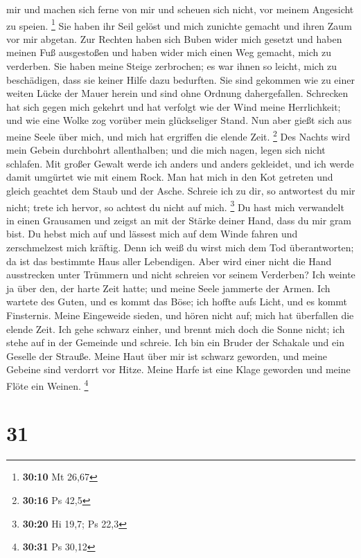 mir und machen sich ferne von mir und scheuen sich nicht, vor meinem
Angesicht zu speien. \footnote{\textbf{30:10} Mt 26,67} 
Sie haben ihr Seil gelöst und mich zunichte gemacht und ihren Zaum vor
mir abgetan.  Zur Rechten haben sich Buben wider mich
gesetzt und haben meinen Fuß ausgestoßen und haben wider mich einen Weg
gemacht, mich zu verderben.  Sie haben meine Steige
zerbrochen; es war ihnen so leicht, mich zu beschädigen, dass sie keiner
Hilfe dazu bedurften.  Sie sind gekommen wie zu einer
weiten Lücke der Mauer herein und sind ohne Ordnung dahergefallen.
 Schrecken hat sich gegen mich gekehrt und hat verfolgt wie
der Wind meine Herrlichkeit; und wie eine Wolke zog vorüber mein
glückseliger Stand.  Nun aber gießt sich aus meine Seele
über mich, und mich hat ergriffen die elende Zeit. \footnote{\textbf{30:16}
  Ps 42,5}  Des Nachts wird mein Gebein durchbohrt
allenthalben; und die mich nagen, legen sich nicht schlafen.
 Mit großer Gewalt werde ich anders und anders gekleidet,
und ich werde damit umgürtet wie mit einem Rock.  Man hat
mich in den Kot getreten und gleich geachtet dem Staub und der Asche.
 Schreie ich zu dir, so antwortest du mir nicht; trete ich
hervor, so achtest du nicht auf mich. \footnote{\textbf{30:20} Hi 19,7;
  Ps 22,3}  Du hast mich verwandelt in einen Grausamen und
zeigst an mit der Stärke deiner Hand, dass du mir gram bist.
 Du hebst mich auf und lässest mich auf dem Winde fahren
und zerschmelzest mich kräftig.  Denn ich weiß du wirst
mich dem Tod überantworten; da ist das bestimmte Haus aller Lebendigen.
 Aber wird einer nicht die Hand ausstrecken unter Trümmern
und nicht schreien vor seinem Verderben?  Ich weinte ja
über den, der harte Zeit hatte; und meine Seele jammerte der Armen.
 Ich wartete des Guten, und es kommt das Böse; ich hoffte
aufs Licht, und es kommt Finsternis.  Meine Eingeweide
sieden, und hören nicht auf; mich hat überfallen die elende Zeit.
 Ich gehe schwarz einher, und brennt mich doch die Sonne
nicht; ich stehe auf in der Gemeinde und schreie.  Ich bin
ein Bruder der Schakale und ein Geselle der Strauße.  Meine
Haut über mir ist schwarz geworden, und meine Gebeine sind verdorrt vor
Hitze.  Meine Harfe ist eine Klage geworden und meine Flöte
ein Weinen. \footnote{\textbf{30:31} Ps 30,12}

\hypertarget{section-7}{%
\section{31}\label{section-7}}

